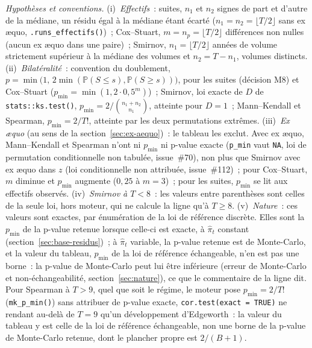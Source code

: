 \documentclass[a4paper,11pt]{article}
\newcommand{\code}[1]{\texttt{\small #1}}
\begin{document}
\noindent\emph{Hypothèses et conventions.} (i)~\emph{Effectifs}~: suites, $n_1$ et $n_2$ signes de
part et d'autre de la médiane, un résidu égal à la médiane étant écarté ($n_1 = n_2 = \lfloor
T/2\rfloor$ sans ex \ae quo, \code{.runs\_effectifs()})~; Cox--Stuart, $m = n_p = \lfloor T/2
\rfloor$ différences non nulles (aucun ex \ae quo dans une paire)~; Smirnov, $n_1 = \lfloor T/2
\rfloor$ années de volume strictement supérieur à la médiane des volumes et $n_2 = T - n_1$,
volumes distincts. (ii)~\emph{Bilatéralité}~: convention du doublement, $p = \min\big(1,\,
2\min(\mathbb{P}(S \le s), \mathbb{P}(S \ge s))\big)$, pour les suites (décision M8) et
Cox--Stuart ($p_{\min} = \min(1, 2\cdot 0{,}5^{m})$)~; Smirnov, loi exacte de $D$ de
\code{stats::ks.test()}, $p_{\min} = 2/\binom{n_1+n_2}{n_1}$, atteinte pour $D = 1$~;
Mann--Kendall et Spearman, $p_{\min} = 2/T!$, atteinte par les deux permutations extrêmes.
(iii)~\emph{Ex \ae quo} (au sens de la section~\ref{sec:ex-aequo})~: le tableau les exclut. Avec ex \ae quo, Mann--Kendall et Spearman n'ont
ni $p_{\min}$ ni p-value exacte (\code{p\_min} vaut \code{NA}, loi de permutation conditionnelle
non tabulée, issue~\#70), non plus que Smirnov avec ex \ae quo dans $z$ (loi conditionnelle non
attribuée, issue~\#112)~; pour Cox--Stuart, $m$ diminue et $p_{\min}$ augmente ($0{,}25$ à
$m = 3$)~; pour les suites, $p_{\min}$ se lit aux effectifs observés. (iv)~\emph{Smirnov
à $T < 8$}~: les valeurs entre parenthèses sont celles de la seule loi, hors moteur, qui ne calcule
la ligne qu'à $T \ge 8$. (v)~\emph{Nature}~: ces valeurs sont exactes, par énumération de la loi
de référence discrète. Elles sont la $p_{\min}$ de la p-value retenue lorsque celle-ci est exacte,
à $\hat\pi_t$ constant (section~\ref{sec:base-residus})~; à $\hat\pi_t$ variable, la p-value retenue
est de Monte-Carlo, et la valeur du tableau, $p_{\min}$ de la loi de référence échangeable, n'en
est pas une borne~: la p-value de Monte-Carlo peut lui être inférieure (erreur de Monte-Carlo et
non-échangeabilité, section~\ref{sec:nature}), ce que le commentaire de la ligne dit. Pour Spearman
à $T > 9$, quel que soit le régime, le moteur pose $p_{\min} = 2/T!$ (\code{mk\_p\_min()}) sans
attribuer de p-value exacte, \code{cor.test(exact = TRUE)} ne rendant au-delà de $T = 9$ qu'un
développement d'Edgeworth~: la valeur du tableau y est celle de la loi de référence échangeable,
non une borne de la p-value de Monte-Carlo retenue, dont le plancher propre est $2/(B+1)$.
\end{document}
